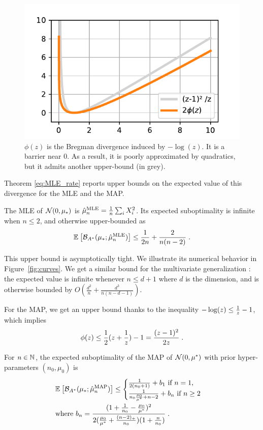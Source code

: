 \documentclass[twoside]{article}
\newcommand*{\expect}[2][]{\ensuremath{\mathbb{E}_{#1} \left[ #2 \right] }} %
\newcommand{\logpart}{A}
\newcommand{\bregmanconj}{\cB_{\logpart^*}}
\newcommand{\m}{\mu}
\begin{document}
\begin{figure}[ht]
	\centering
	\includegraphics[width=.4\textwidth]{phi.pdf}
	\caption{$\phi(z)$ is the Bregman divergence induced by $-\log(z)$. It is a barrier near $0$. As a result, it is poorly approximated by quadratics, but it admits another upper-bound (in grey).}
	\label{fig:phi}
\end{figure}

Theorem \ref{eq:MLE_rate} reports upper bounds on the expected value of this divergence for the MLE and the MAP.

\begin{theorem}
	The MLE of $\cN(0,\m_*)$ is $\hat \m_n^\text{MLE} = \inv{n} \sum_i X_i^2 $.
	Its expected suboptimality is infinite when $n\leq 2$, and otherwise upper-bounded as
	\begin{align}
		 \expect{\bregmanconj( \m_*; \hat \m_n^\text{MLE}) }
			\leq \inv{2n} +\frac{2}{n(n-2)} \; .
			\label{eq:MLE_rate}
	\end{align}
\end{theorem}

This upper bound is asymptotically tight.
We illustrate its numerical behavior in Figure~\ref{fig:curves}.
We get a similar bound for the multivariate generalization :
the expected value is infinite whenever $n \leq d+1$ where $d$ is the dimension, and is otherwise bounded by $O(\frac{d^2}{n} + \frac{d^3}{n(n-d-1)} )$.

For the MAP, we get an upper bound thanks to the inequality $ - \log(z) \leq \frac{1}{z} - 1$, which implies
\begin{align}
	\label{eq:log_bound}
	\phi(z) \leq \frac{1}{2} (z + \frac{1}{z}) - 1 = \frac{(z-1)^2}{2 z} \; .
\end{align}

\begin{theorem}
For $n\in \mathbb{N}$, the expected suboptimality of the MAP of $\cN(0,\m^*)$ with prior hyper-parameters $(n_0,\m_0)$ is
 \begin{align}
	& \expect{\bregmanconj( \m_*; \hat \m_n^\mathrm{MAP})}
	\leq \begin{cases}
		\inv{2(n_0+1)}  +  b_1 \ \text{if}\ n=1,\\
		\frac{1}{n_0 \frac{\m_0}{\m^*} +n-2} + b_n \ \text{if}\ n\geq 2
	\end{cases}
	\label{eq:MAP_rate}\\
	& \text{where }b_n = \frac{(1 + \inv{n_0} - \frac{\m_0}{\m^*})^2}{2 (\frac{\m_0}{\m^*}+\frac{(n-2)_+}{n_0})(1 + \frac{n}{n_0} )} \; . \nonumber
\end{align}
\end{theorem}
\end{document}
